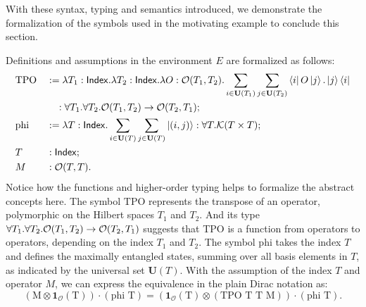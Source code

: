 With these syntax, typing and semantics introduced, we demonstrate the formalization of the symbols used in the motivating example to conclude this section.
\begin{example}
    \label{ex: formalizing motivating}
    Definitions and assumptions in the environment \( E \) are formalized as follows:
    \begin{align*}
        & \text{TPO} && := \lambda T_1 : \mathsf{Index}. \lambda T_2 : \mathsf{Index}. \lambda O : \mathcal{O}(T_1, T_2). \sum_{i \in \mathbf{U}(T_1)} \sum_{j \in \mathbf{U}(T_2)} \bra{i} O \ket{j} . \ket{j}\bra{i} \\
        & &&\quad : \forall T_1. \forall T_2. \mathcal{O}(T_1, T_2) \to \mathcal{O}(T_2, T_1); \\
        &\text{phi} &&:= \lambda T : \mathsf{Index}. \sum_{i \in \mathbf{U}(T)} \sum_{j \in \mathbf{U}(T)} \ket{(i, j)} : \forall T.\mathcal{K}(T \times T); \\
        & T && : \mathsf{Index}; \\
        & M && : \mathcal{O}(T, T).
    \end{align*}
    Notice how the functions and higher-order typing helps to formalize the abstract concepts here.
    The symbol \( \text{TPO} \) represents the transpose of an operator, polymorphic on the Hilbert spaces \( T_1 \) and \( T_2 \). And its type \(\forall T_1. \forall T_2. \mathcal{O}(T_1, T_2) \to \mathcal{O}(T_2, T_1)\) suggests that TPO is a function from operators to operators, depending on the index $T_1$ and $T_2$.
    The symbol \( \text{phi} \) takes the index \( T \) and defines the maximally entangled states, summing over all basis elements in \( T \), as indicated by the universal set \( \mathbf{U}(T) \).
    With the assumption of the index \( T \) and operator \( M \), we can express the equivalence in the plain Dirac notation as:
    \[
    (\textrm{M} \otimes \mathbf{1}_\mathcal{O}(\textrm{T})) \cdot (\textrm{phi T}) = (\mathbf{1}_\mathcal{O}(\textrm{T}) \otimes (\textrm{TPO T T M})) \cdot (\textrm{phi T}).
    \]
\end{example}
